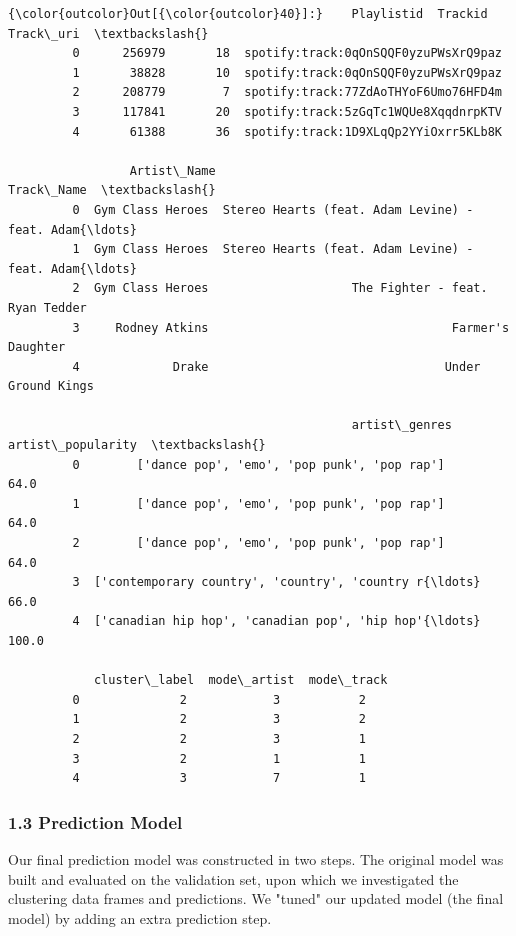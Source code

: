\documentclass[11pt]{article}
\begin{document}
\begin{Verbatim}[commandchars=\\\{\}]
{\color{outcolor}Out[{\color{outcolor}40}]:}    Playlistid  Trackid                             Track\_uri  \textbackslash{}
         0      256979       18  spotify:track:0qOnSQQF0yzuPWsXrQ9paz   
         1       38828       10  spotify:track:0qOnSQQF0yzuPWsXrQ9paz   
         2      208779        7  spotify:track:77ZdAoTHYoF6Umo76HFD4m   
         3      117841       20  spotify:track:5zGqTc1WQUe8XqqdnrpKTV   
         4       61388       36  spotify:track:1D9XLqQp2YYiOxrr5KLb8K   
         
                 Artist\_Name                                         Track\_Name  \textbackslash{}
         0  Gym Class Heroes  Stereo Hearts (feat. Adam Levine) - feat. Adam{\ldots}   
         1  Gym Class Heroes  Stereo Hearts (feat. Adam Levine) - feat. Adam{\ldots}   
         2  Gym Class Heroes                    The Fighter - feat. Ryan Tedder   
         3     Rodney Atkins                                  Farmer's Daughter   
         4             Drake                                 Under Ground Kings   
         
                                                artist\_genres  artist\_popularity  \textbackslash{}
         0        ['dance pop', 'emo', 'pop punk', 'pop rap']               64.0   
         1        ['dance pop', 'emo', 'pop punk', 'pop rap']               64.0   
         2        ['dance pop', 'emo', 'pop punk', 'pop rap']               64.0   
         3  ['contemporary country', 'country', 'country r{\ldots}               66.0   
         4  ['canadian hip hop', 'canadian pop', 'hip hop'{\ldots}              100.0   
         
            cluster\_label  mode\_artist  mode\_track  
         0              2            3           2  
         1              2            3           2  
         2              2            3           1  
         3              2            1           1  
         4              3            7           1  
\end{Verbatim}
            
    \subsubsection{1.3 Prediction Model}\label{prediction-model}

    Our final prediction model was constructed in two steps. The original
model was built and evaluated on the validation set, upon which we
investigated the clustering data frames and predictions. We "tuned" our
updated model (the final model) by adding an extra prediction step.
\end{document}
